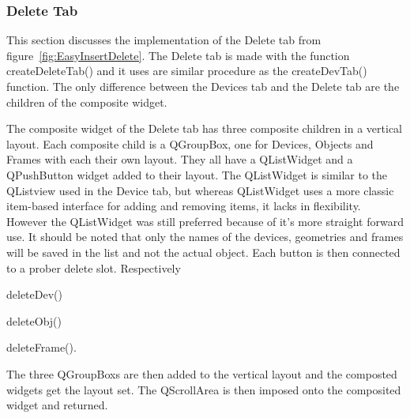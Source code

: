 \subsubsection{Delete Tab}
\label{sec:DelTab}

This section discusses the implementation of the Delete tab from figure~\ref{fig:EasyInsertDelete}. The Delete tab is made with the function createDeleteTab() and it uses are similar procedure as the createDevTab() function. The only difference between the Devices tab and the Delete tab are the children of the composite widget.

The composite widget of the Delete tab has three composite children in a vertical layout. Each composite child is a QGroupBox, one for Devices, Objects and Frames with each their own layout. They all have a QListWidget and a QPushButton widget added to their layout. The QListWidget is similar to the QListview used in the Device tab, but whereas QListWidget uses a more classic item-based interface for adding and removing items, it lacks in flexibility. However the QListWidget was still preferred because of it's more straight forward use. It should be noted that only the names of the devices, geometries and frames will be saved in the list and not the actual object. Each button is then connected to a prober delete slot. Respectively \begin{enumerate*}[font={\color{red!50!black}\bfseries}]
\item deleteDev()
\item deleteObj()
\item deleteFrame().
\end{enumerate*} 
The three QGroupBoxs are then added to the vertical layout and the composted widgets get the layout set. The QScrollArea is then imposed onto the composited widget and returned.
